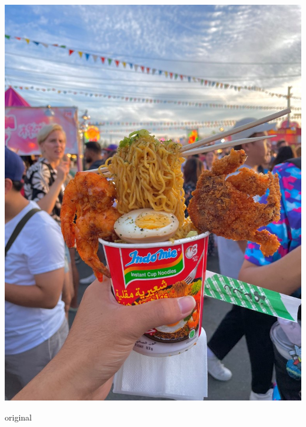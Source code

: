 \documentclass{article}
\begin{document}
\begin{newpage}
\begin{center}
\begin{minipage}{0.8\textwidth}
\begin{minipage}{0.3\linewidth}
            \centerline{\includegraphics[width=\textwidth]{../python/ramen.jpg}}
            \centerline{original}
        \end{minipage}
        \begin{minipage}{0.3\linewidth}
            \vspace{\gap}

\end{minipage}
\end{minipage}
\end{center}
\end{newpage}
\end{document}
